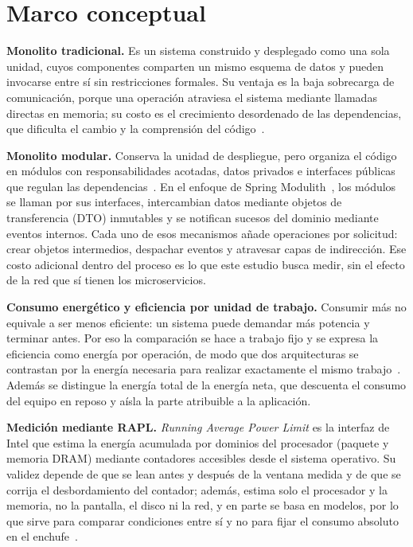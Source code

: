 \section{Marco conceptual}
\label{sec:marco-conceptual}

\textbf{Monolito tradicional.} Es un sistema construido y desplegado como una sola unidad, cuyos componentes comparten un mismo esquema de datos y pueden invocarse entre sí sin restricciones formales. Su ventaja es la baja sobrecarga de comunicación, porque una operación atraviesa el sistema mediante llamadas directas en memoria; su costo es el crecimiento desordenado de las dependencias, que dificulta el cambio y la comprensión del código~\cite{aldebagy2018comparative,newman2021microservices}.

\textbf{Monolito modular.} Conserva la unidad de despliegue, pero organiza el código en módulos con responsabilidades acotadas, datos privados e interfaces públicas que regulan las dependencias~\cite{newman2021microservices}. En el enfoque de Spring Modulith~\cite{springmodulith2025}, los módulos se llaman por sus interfaces, intercambian datos mediante objetos de transferencia (DTO) inmutables y se notifican sucesos del dominio mediante eventos internos. Cada uno de esos mecanismos añade operaciones por solicitud: crear objetos intermedios, despachar eventos y atravesar capas de indirección. Ese costo adicional dentro del proceso es lo que este estudio busca medir, sin el efecto de la red que sí tienen los microservicios.

\textbf{Consumo energético y eficiencia por unidad de trabajo.} Consumir más no equivale a ser menos eficiente: un sistema puede demandar más potencia y terminar antes. Por eso la comparación se hace a trabajo fijo y se expresa la eficiencia como energía por operación, de modo que dos arquitecturas se contrastan por la energía necesaria para realizar exactamente el mismo trabajo~\cite{kern2018sustainable}. Además se distingue la energía total de la energía neta, que descuenta el consumo del equipo en reposo y aísla la parte atribuible a la aplicación.

\textbf{Medición mediante RAPL.} \textit{Running Average Power Limit} es la interfaz de Intel que estima la energía acumulada por dominios del procesador (paquete y memoria DRAM) mediante contadores accesibles desde el sistema operativo. Su validez depende de que se lean antes y después de la ventana medida y de que se corrija el desbordamiento del contador; además, estima solo el procesador y la memoria, no la pantalla, el disco ni la red, y en parte se basa en modelos, por lo que sirve para comparar condiciones entre sí y no para fijar el consumo absoluto en el enchufe~\cite{khan2018rapl,centofanti2024power}.

